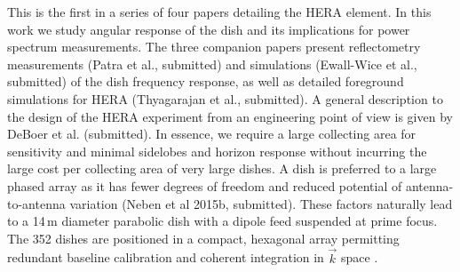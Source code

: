 \documentclass{emulateapj}
\begin{document}

This is the first in a series of four papers detailing the HERA element. In this work we study 
angular response of the dish and its implications for power spectrum measurements. The three companion 
papers present reflectometry measurements (Patra et al., submitted) and simulations (Ewall-Wice et al., 
submitted) of the dish frequency response, as well as detailed 
foreground simulations for HERA (Thyagarajan et al., submitted). A general description to the design of the 
HERA experiment from an engineering point of view is given by DeBoer et al. (submitted). In essence, we 
require a large collecting area for
 sensitivity and minimal sidelobes and horizon response without incurring the large cost per collecting 
area of very large dishes. A dish is preferred to a large phased array as it has fewer degrees 
of freedom and reduced potential of antenna-to-antenna variation (Neben et al 2015b, 
submitted). These factors naturally lead to a 14\,m diameter parabolic dish with a dipole 
feed suspended at prime focus. The 352 dishes are positioned in a compact, hexagonal 
array permitting redundant baseline calibration and coherent integration in $
\vec{k}$ space \citep{omniscope,ali2015}. 
\end{document}
